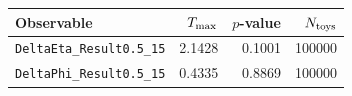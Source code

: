\begin{tabular}{|l|r|r|r|}
\hline
Observable & $T_{\rm max}$ & $p$-value & $N_{\rm toys}$ \\
\hline
\texttt{DeltaEta\_Result0.5\_15} & 2.1428 & 0.1001 & 100000 \\
\texttt{DeltaPhi\_Result0.5\_15} & 0.4335 & 0.8869 & 100000 \\
\hline
\end{tabular}
